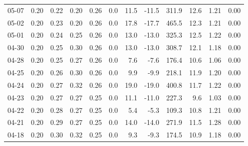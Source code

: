 \begin{threeparttable}
{\begin{tabular}{lrrrrrrrrrrr}
  05-07 &          0.20 &          0.22 &          0.20 &        0.26 &                 0.0 &                11.5 &      -11.5 &               311.9 &             12.6 &            1.21 &                   0.00 \\
  05-02 &          0.20 &          0.23 &          0.20 &        0.26 &                 0.0 &                17.8 &      -17.7 &               465.5 &             12.3 &            1.21 &                   0.00 \\
  05-01 &          0.20 &          0.24 &          0.25 &        0.26 &                 0.0 &                13.0 &      -13.0 &               325.3 &             12.5 &            1.22 &                   0.00 \\
  04-30 &          0.20 &          0.25 &          0.30 &        0.26 &                 0.0 &                13.0 &      -13.0 &               308.7 &             12.1 &            1.18 &                   0.00 \\
  04-28 &          0.20 &          0.25 &          0.27 &        0.26 &                 0.0 &                 7.6 &       -7.6 &               176.4 &             10.6 &            1.06 &                   0.00 \\
  04-25 &          0.20 &          0.26 &          0.30 &        0.26 &                 0.0 &                 9.9 &       -9.9 &               218.1 &             11.9 &            1.20 &                   0.00 \\
  04-24 &          0.20 &          0.27 &          0.32 &        0.26 &                 0.0 &                19.0 &      -19.0 &               400.8 &             11.7 &            1.22 &                   0.00 \\
  04-23 &          0.20 &          0.27 &          0.27 &        0.25 &                 0.0 &                11.1 &      -11.0 &               227.3 &              9.6 &            1.03 &                   0.00 \\
  04-22 &          0.20 &          0.28 &          0.27 &        0.25 &                 0.0 &                 5.4 &       -5.3 &               109.3 &             10.8 &            1.21 &                   0.00 \\
  04-21 &          0.20 &          0.29 &          0.27 &        0.25 &                 0.0 &                14.0 &      -14.0 &               271.9 &             11.5 &            1.28 &                   0.00 \\
  04-18 &          0.20 &          0.30 &          0.32 &        0.25 &                 0.0 &                 9.3 &       -9.3 &               174.5 &             10.9 &            1.18 &                   0.00 \\

\end{tabular}}
\end{threeparttable}
